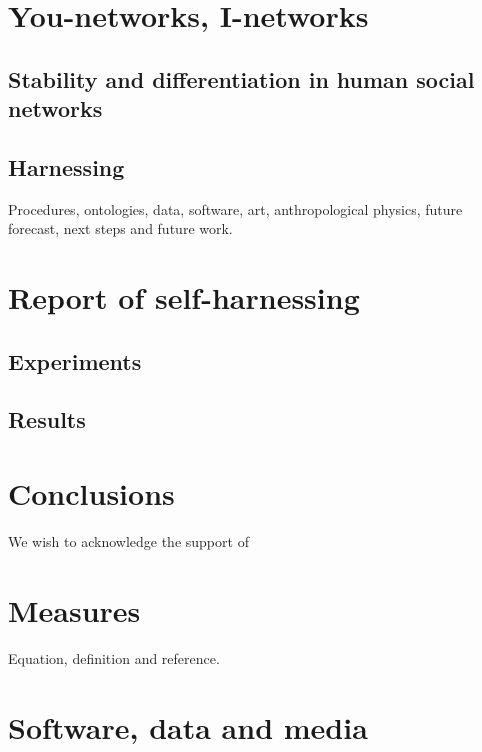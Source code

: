 \documentclass[%
 aip,
 jmp,%
 amsmath,amssymb,
 reprint,%
]{revtex4-1}
\begin{document}
\section{\label{sec:inet}You-networks, I-networks}
\subsection{\label{sec:stabdiff}Stability and differentiation in human social networks}
\subsection{\label{sec:harn}Harnessing}
Procedures, ontologies, data, software, art, anthropological physics, 
future forecast, next steps and future work.
\section{\label{sec:self}Report of self-harnessing}
\subsection{\label{sec:exp}Experiments}
\subsection{\label{sec:res}Results}
\section{\label{sec:conc}Conclusions}

\begin{acknowledgments}
We wish to acknowledge the support of 
\end{acknowledgments}

\appendix

\section{Measures}
Equation, definition and reference.

\section{Software, data and media}
\end{document}
